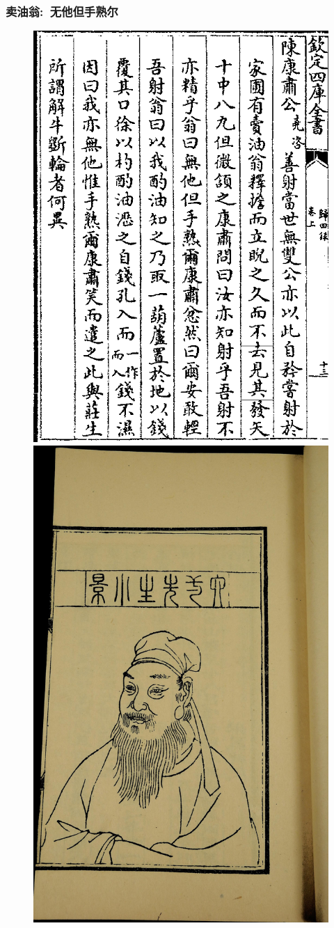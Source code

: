 {
	\frametitle{卖油翁:~无他但手熟尔}
\begin{figure}[h!]
\centering
\vspace{-10.5pt}
\includegraphics[height=0.65\textwidth]{Figures/Sale_Oil_Ouyang.png}
\hspace{1pt}
\includegraphics[height=0.65\textwidth]{Figures/Ouyang_Xiu-2.jpg}
\caption{\fontsize{6.2pt}{5.2pt}}
\label{Sale_oil}
\end{figure}
}

